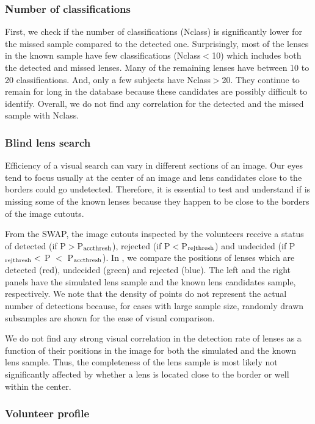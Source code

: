 \documentclass[useAMS,usenatbib,a4paper]{mn2e}
\begin{document}
\subsubsection{Number of classifications}
First, we check if the number of classifications (Nclass) is
significantly lower for the missed sample compared to the detected one.
Surprisingly, most of the lenses in the known sample have few
classifications (Nclass$<$10) which includes both the detected and
missed lenses. Many of the remaining lenses have between 10 to 20
classifications. And, only a few subjects have Nclass$>$20. They
continue to remain for long in the database because these candidates are
possibly difficult to identify. Overall, we do not find any correlation
for the detected and the missed sample with Nclass.

\subsubsection{Blind lens search}
Efficiency of a visual search can vary in different sections of an
image. Our eyes tend to focus usually at the center of an image and lens
candidates close to the borders could go undetected. Therefore, it is
essential to test and understand if \sw is missing some of the known lenses
because they happen to be close to the borders of the image cutouts.

From the SWAP, the image cutouts inspected by the \sw volunteers receive
a status of detected (if P$>$P$_{\rm acc thresh}$), rejected (if
P$<$P$_{\rm rej thresh}$) and undecided (if P$_{\rm rej thresh}<$ P $<$
P$_{\rm acc thresh}$). In , we compare the positions
of lenses which are detected (red), undecided (green) and rejected
(blue). The left and the right panels have the simulated lens sample and
the known lens candidates sample, respectively. We note that the density
of points do not represent the actual number of detections because, for
cases with large sample size, randomly drawn subsamples are shown for
the ease of visual comparison.

We do not find any strong visual correlation in the detection rate of
lenses as a function of their positions in the image for both the
simulated and the known lens sample. Thus, the completeness of the lens
sample is most likely not significantly affected by whether a lens is
located close to the border or well within the center.

\subsubsection{Volunteer profile}
\end{document}
